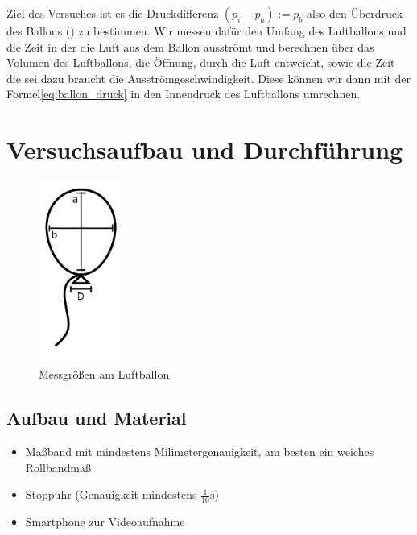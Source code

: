 \documentclass{article}
\begin{document}
    Ziel des Versuches ist es die Druckdifferenz \( (p_i - p_a) := p_b \) also den Überdruck des Ballons (\cite{Überdruck}) zu bestimmen.
    Wir messen dafür den Umfang des Luftballons und die Zeit in der die Luft aus dem Ballon ausströmt und berechnen über das Volumen des Luftballons, die Öffnung, durch die Luft entweicht,
    sowie die Zeit die sei dazu braucht die Ausströmgeschwindigkeit. Diese können wir dann mit der Formel\ref{eq:ballon_druck} in den Innendruck des Luftballons umrechnen.

    \section{Versuchsaufbau und Durchführung}
    
    \begin{figure}[h]\label{fig:abmessungen}
        \centering
        \includegraphics[height=6cm]{luftballons.png}
        \caption{Messgrößen am Luftballon}
    \end{figure}

    \subsection{Aufbau und Material}
    \begin{itemize}
        \item Maßband mit mindestens Milimetergenauigkeit, am besten ein weiches Rollbandmaß
        \item Stoppuhr (Genauigkeit mindestens \( \frac{1}{10}\unit{\second} \))
        \item Smartphone zur Videoaufnahme
    \end{itemize}
\end{document}
